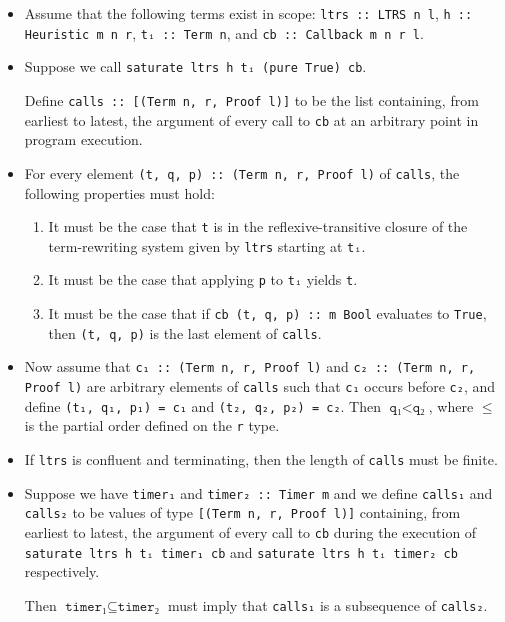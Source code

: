 \documentclass[11pt]{report}
\newcommand{\haskell}[1]{\texttt{#1}}
\begin{document}
\begin{itemize}
\item {%
  Assume that the following terms exist in scope:
  \haskell{ltrs :: LTRS n l}, \haskell{h :: Heuristic m n r},
  \haskell{tᵢ :: Term n}, and \haskell{cb :: Callback m n r l}.
}
\item {%
  Suppose we call
  \texttt{\haskell{saturate} \haskell{ltrs} \haskell{h} \haskell{tᵢ} (\haskell{pure} \haskell{True}) \haskell{cb}}.

  Define \haskell{calls :: [(Term n, r, Proof l)]} to be the list containing,
  from earliest to latest, the argument of every call to \haskell{cb} at an
  arbitrary point in program execution.
}
\item {%
  For every element \haskell{(t, q, p) :: (Term n, r, Proof l)} of
  \haskell{calls}, the following properties must hold:
  \begin{enumerate}
  \item {%
    It must be the case that \haskell{t} is in the reflexive-transitive closure
    of the term-rewriting system given by \haskell{ltrs} starting
    at \haskell{tᵢ}.
  }
  \item {%
    It must be the case that applying \haskell{p} to \haskell{tᵢ}
    yields \haskell{t}.
  }
  \item {%
    It must be the case that if \texttt{cb (t, q, p) \haskell{:: m Bool}}
    evaluates to \haskell{True}, then \haskell{(t, q, p)} is the last element
    of \haskell{calls}.
  }
  \end{enumerate}
}
\item {%
  Now assume that \haskell{c₁ :: (Term n, r, Proof l)} and
  \haskell{c₂ :: (Term n, r, Proof l)} are arbitrary elements of
  \haskell{calls} such that \haskell{c₁} occurs before \haskell{c₂},
  and define \haskell{(t₁, q₁, p₁) = c₁} and \haskell{(t₂, q₂, p₂) = c₂}.
  Then $\haskell{q₁} < \haskell{q₂}$, where ${\le}$ is the partial order
  defined on the \texttt{r} type.
}
\item {%
  If \haskell{ltrs} is confluent and terminating, then the length of
  \haskell{calls} must be finite.
}
\item {%
  Suppose we have \haskell{timer₁} and \haskell{timer₂ :: Timer m} and we define
  \haskell{calls₁} and \haskell{calls₂} to be values of type
  \haskell{[(Term n, r, Proof l)]} containing, from earliest to latest,
  the argument of every call to \haskell{cb} during the execution of
  \texttt{\haskell{saturate} \haskell{ltrs} \haskell{h} \haskell{tᵢ} \haskell{timer₁} \haskell{cb}}
  and
  \texttt{\haskell{saturate} \haskell{ltrs} \haskell{h} \haskell{tᵢ} \haskell{timer₂} \haskell{cb}}
  respectively.

  Then $\haskell{timer₁} \subseteq \haskell{timer₂}$ must imply that
  \haskell{calls₁} is a subsequence of \haskell{calls₂}.
}
\end{itemize}
\end{document}
